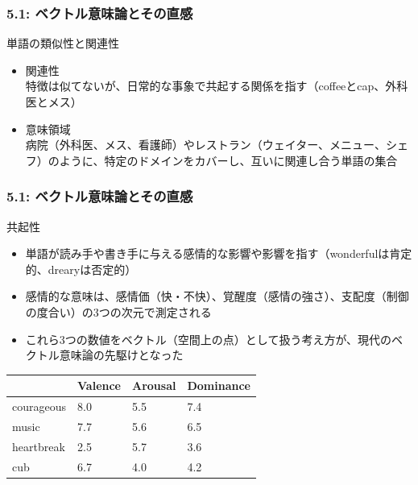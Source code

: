 \documentclass[unicode,11pt]{beamer} %
\begin{document}
\begin{frame}
    \frametitle{5.1: ベクトル意味論とその直感}
    \begin{alertblock}{単語の類似性と関連性}
        \begin{itemize}
            \item 関連性\\特徴は似てないが、日常的な事象で共起する関係を指す（coffeeとcap、外科医とメス）
            \item 意味領域\\病院（外科医、メス、看護師）やレストラン（ウェイター、メニュー、シェフ）のように、特定のドメインをカバーし、互いに関連し合う単語の集合
        \end{itemize}
    \end{alertblock}
\end{frame}

\begin{frame}
    \frametitle{5.1: ベクトル意味論とその直感}
    \begin{alertblock}{共起性}
        \begin{itemize}
            \item 単語が読み手や書き手に与える感情的な影響や影響を指す（wonderfulは肯定的、drearyは否定的）
            \item 感情的な意味は、感情価（快・不快）、覚醒度（感情の強さ）、支配度（制御の度合い）の3つの次元で測定される
            \item これら3つの数値をベクトル（空間上の点）として扱う考え方が、現代のベクトル意味論の先駆けとなった
        \end{itemize}
    \end{alertblock}
    \begin{table}
        \centering
        \begin{tabular}{llll}
            \hline
                & Valence & Arousal & Dominance \\
            \hline
            courageous & 8.0 & 5.5 & 7.4 \\
            music & 7.7 & 5.6 & 6.5 \\
            heartbreak & 2.5 & 5.7 & 3.6 \\
            cub & 6.7 & 4.0 & 4.2 \\
            \hline 
        \end{tabular}
    \end{table}
\end{frame}

\end{document}

